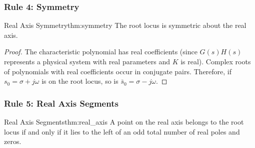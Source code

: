 \subsubsection{Rule 4: Symmetry}

\begin{theorem}{Real Axis Symmetry}{thm:symmetry}
The root locus is symmetric about the real axis.
\end{theorem}

\begin{proof}
The characteristic polynomial has real coefficients (since $G(s)H(s)$ represents a physical system with real parameters and $K$ is real). Complex roots of polynomials with real coefficients occur in conjugate pairs. Therefore, if $s_0 = \sigma + j\omega$ is on the root locus, so is $\bar{s}_0 = \sigma - j\omega$.
\end{proof}

\subsubsection{Rule 5: Real Axis Segments}

\begin{theorem}{Real Axis Segments}{thm:real_axis}
A point on the real axis belongs to the root locus if and only if it lies to the left of an odd total number of real poles and zeros.
\end{theorem}

